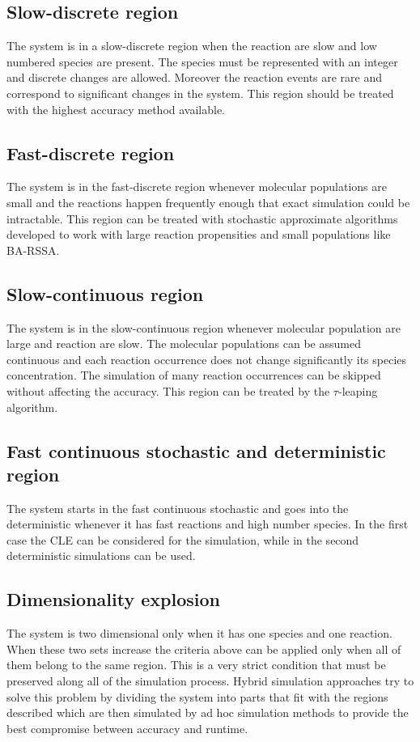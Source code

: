   \subsection{Slow-discrete region}
  The system is in a slow-discrete region when the reaction are slow and low numbered species are present.
  The species must be represented with an integer and discrete changes are allowed.
  Moreover the reaction events are rare and correspond to significant changes in the system.
  This region should be treated with the highest accuracy method available.

  \subsection{Fast-discrete region}
  The system is in the fast-discrete region whenever molecular populations are small and the reactions happen frequently enough that exact simulation could be intractable.
  This region can be treated with stochastic approximate algorithms developed to work with large reaction propensities and small populations like BA-RSSA.

  \subsection{Slow-continuous region}
  The system is in the slow-continuous region whenever molecular population are large and reaction are slow.
  The molecular populations can be assumed continuous and each reaction occurrence does not change significantly its species concentration.
  The simulation of many reaction occurrences can be skipped without affecting the accuracy.
  This region can be treated by the $\tau$-leaping algorithm.

  \subsection{Fast continuous stochastic and deterministic region}
  The system starts in the fast continuous stochastic and goes into the deterministic whenever it has fast reactions and high number species.
  In the first case the CLE can be considered for the simulation, while in the second deterministic simulations can be used.

  \subsection{Dimensionality explosion}
  The system is two dimensional only when it has one species and one reaction.
  When these two sets increase the criteria above can be applied only when all of them belong to the same region.
  This is a very strict condition that must be preserved along all of the simulation process.
  Hybrid simulation approaches try to solve this problem by dividing the system into parts that fit with the regions described which are then simulated by ad hoc simulation methods to provide the best compromise between accuracy and runtime.





